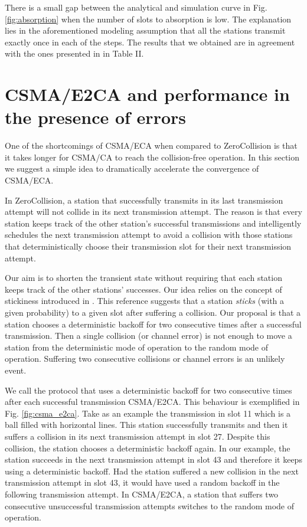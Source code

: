 \documentclass[journal]{IEEEtran}
\begin{document}
There is a small gap between the analytical and simulation curve in Fig.\ref{fig:absorption} when the number of slots to absorption is low. The explanation lies in the aforementioned modeling assumption that all the stations transmit exactly once in each of the steps. The results that we obtained are in agreement with the ones presented in \cite{he2009sbr} in Table II.

\section{CSMA/E2CA and performance in the presence of errors}
\label{sec:e2ca}

One of the shortcomings of CSMA/ECA when compared to ZeroCollision is that it takes longer for CSMA/CA to reach the collision-free operation. In this section we suggest a simple idea to dramatically accelerate the convergence of CSMA/ECA. 


In ZeroCollision, a station that successfully transmits in its last transmission attempt will not collide in its next transmission attempt. The reason is that every station keeps track of the other station's successful transmissions and intelligently schedules the next transmission attempt to avoid a collision with those stations that deterministically choose their transmission slot for their next transmission attempt.

Our aim is to shorten the transient state without requiring that each station keeps track of the other stations' successes. Our idea relies on the concept of stickiness introduced in \cite{fang2009dlm}. This reference suggests that a station \emph{sticks} (with a given probability) to a given slot after suffering a collision. Our proposal is that a station chooses a deterministic backoff for two consecutive times after a successful transmission. Then a single collision (or channel error) is not enough to move a station from the deterministic mode of operation to the random mode of operation. Suffering two consecutive collisions or channel errors is an unlikely event.

We call the protocol that uses a deterministic backoff for two consecutive times after each successful transmission CSMA/E2CA. This behaviour is exemplified in Fig. \ref{fig:csma_e2ca}. Take as an example the transmission in slot 11 which is a ball filled with horizontal lines. This station successfully transmits and then it suffers a collision in its next transmission attempt in slot 27. Despite this collision, the station chooses a deterministic backoff again. 
 In our example, the station succeeds in the next transmission attempt in slot 43 and therefore it keeps using a deterministic backoff.
Had the station suffered a new collision in the next transmission attempt in slot 43, it would have used a random backoff in the following transmission attempt. In CSMA/E2CA, a station that suffers two consecutive unsuccessful transmission attempts switches to the random mode of operation.
\end{document}
